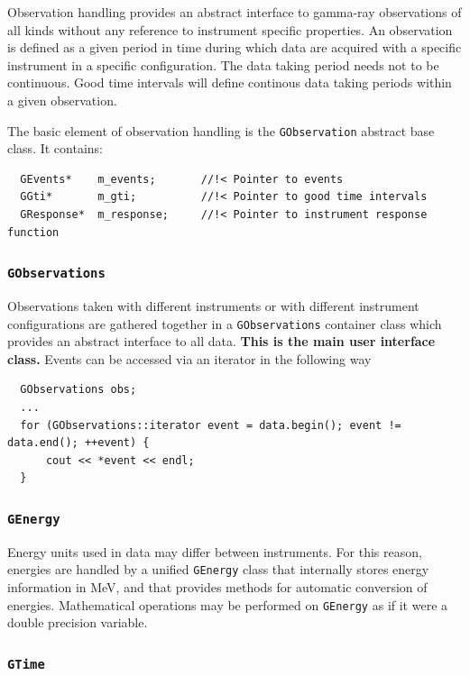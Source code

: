 \documentclass{article}[12pt,a4]
\begin{document}
Observation handling provides an abstract interface to gamma-ray observations of all kinds
without any reference to instrument specific properties.
An observation is defined as a given period in time during which data are acquired with a
specific instrument in a specific configuration.
The data taking period needs not to be continuous.
Good time intervals will define continous data taking periods within a given observation.

The basic element of observation handling is the {\tt GObservation} abstract base class.
It contains:
\begin{verbatim}
  GEvents*    m_events;       //!< Pointer to events
  GGti*       m_gti;          //!< Pointer to good time intervals
  GResponse*  m_response;     //!< Pointer to instrument response function
\end{verbatim}


\subsubsection{{\tt GObservations}}

Observations taken with different instruments or with different instrument configurations are
gathered together in a {\tt GObservations} container class which provides an abstract interface 
to all data.
{\bf This is the main user interface class.}
Events can be accessed via an iterator in the following way
\begin{verbatim}
  GObservations obs;
  ...
  for (GObservations::iterator event = data.begin(); event != data.end(); ++event) {
      cout << *event << endl;
  }
\end{verbatim}


\subsubsection{{\tt GEnergy}}

Energy units used in data may differ between instruments.
For this reason, energies are handled by a unified {\tt GEnergy} class that internally
stores energy information in MeV, and that provides methods for automatic conversion
of energies.
Mathematical operations may be performed on {\tt GEnergy} as if it were a double
precision variable.


\subsubsection{{\tt GTime}}
\end{document}
